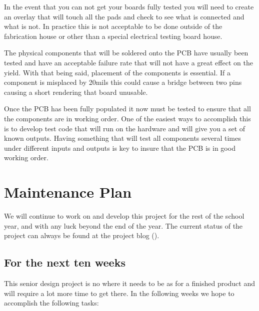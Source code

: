 \documentclass{article}
\numberwithin{equation}{section} %
\begin{document}
In the event that you can not get your boards fully tested you will need to create an overlay that will touch all the pads and check to see what is connected and what is not. In practice this is not acceptable to be done outside of the fabrication house or other than a special electrical testing board house.

The physical components that will be soldered onto the PCB have usually been tested and have an acceptable failure rate that will not have a great effect on the yield. With that being said, placement of the components is essential. If a component is misplaced by 20mils this could cause a bridge between two pins causing a short rendering that board unusable.

Once the PCB has been fully populated it now must be tested to ensure that all the components are in working order. One of the easiest ways to accomplish this is to develop test code that will run on the hardware and will give you a set of known outputs. Having something that will test all components several times under different inputs and outputs is key to insure that the PCB is in good working order.

\section{Maintenance Plan}
We will continue to work on and develop this project for the rest of the school year, and with any luck beyond the end of the year. The current status of the project can always be found at the project blog (\cite{anzhelka_blog}).

\subsection{For the next ten weeks} \label{subsec:maintenance_plan_10}
This senior design project is no where it needs to be as for a finished product and will require a lot more time to get there. In the following weeks we hope to accomplish the following tasks:
\end{document}
